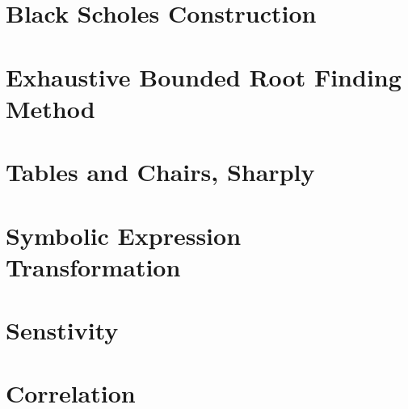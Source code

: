 \documentclass[12pt,letterpaper,oneside]{book}
\theoremstyle{plain}
\theoremstyle{definition}
\theoremstyle{remark}
\numberwithin{theorem}{chapter}
\begin{document}
\chapter{Black Scholes Construction}



\appendix
\chapter{Exhaustive Bounded Root Finding Method}

%
\chapter{Tables and Chairs, Sharply}

\chapter{Symbolic Expression Transformation}

\chapter{Senstivity}


\chapter{Correlation}




\end{document}
